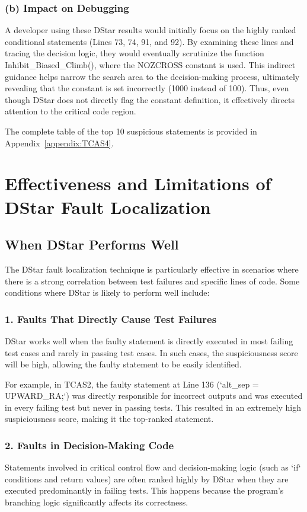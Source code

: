 \documentclass[conference]{IEEEtran}
\begin{document}
\subsubsection*{(b) Impact on Debugging}
A developer using these DStar results would initially focus on the highly ranked conditional statements (Lines 73, 74, 91, and 92). By examining these lines and tracing the decision logic, they would eventually scrutinize the function Inhibit\_Biased\_Climb(), where the NOZCROSS constant is used. This indirect guidance helps narrow the search area to the decision-making process, ultimately revealing that the constant is set incorrectly (1000 instead of 100). Thus, even though DStar does not directly flag the constant definition, it effectively directs attention to the critical code region.

The complete table of the top 10 suspicious statements is provided in Appendix~\ref{appendix:TCAS4}.

\section{Effectiveness and Limitations of DStar Fault Localization}

\subsection{When DStar Performs Well}
The DStar fault localization technique is particularly effective in scenarios where there is a strong correlation between test failures and specific lines of code. Some conditions where DStar is likely to perform well include:

\subsubsection{1. Faults That Directly Cause Test Failures}
DStar works well when the faulty statement is directly executed in most failing test cases and rarely in passing test cases. In such cases, the suspiciousness score will be high, allowing the faulty statement to be easily identified. 

For example, in TCAS2, the faulty statement at Line 136 (`alt\_sep = UPWARD\_RA;`) was directly responsible for incorrect outputs and was executed in every failing test but never in passing tests. This resulted in an extremely high suspiciousness score, making it the top-ranked statement.

\subsubsection{2. Faults in Decision-Making Code}
Statements involved in critical control flow and decision-making logic (such as `if` conditions and return values) are often ranked highly by DStar when they are executed predominantly in failing tests. This happens because the program's branching logic significantly affects its correctness.
\end{document}
